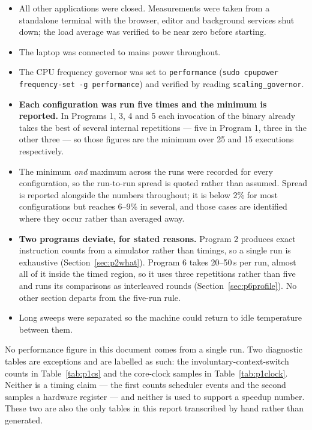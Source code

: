 \documentclass[11pt,a4paper]{article}
\begin{document}
\begin{itemize}
\item All other applications were closed. Measurements were taken from a
      standalone terminal with the browser, editor and background services
      shut down; the load average was verified to be near zero before
      starting.
\item The laptop was connected to mains power throughout.
\item The CPU frequency governor was set to \texttt{performance}
      (\texttt{sudo cpupower frequency-set -g performance}) and verified by
      reading \texttt{scaling\_governor}.
\item \textbf{Each configuration was run five times and the minimum is
      reported.} In Programs 1, 3, 4 and 5 each invocation of the binary
      already takes the best of several internal repetitions --- five in
      Program 1, three in the other three --- so those figures are the minimum
      over 25 and 15 executions respectively.
\item The minimum \emph{and} maximum across the runs were recorded for every
      configuration, so the run-to-run spread is quoted rather than assumed.
      Spread is reported alongside the numbers throughout; it is below 2\% for
      most configurations but reaches 6--9\% in several, and those cases are
      identified where they occur rather than averaged away.
\item \textbf{Two programs deviate, for stated reasons.} Program 2 produces
      exact instruction counts from a simulator rather than timings, so a
      single run is exhaustive (Section~\ref{sec:p2what}). Program 6 takes
      20--50\,s per run, almost all of it inside the timed region, so it uses
      three repetitions rather than five and runs its comparisons as
      interleaved rounds (Section~\ref{sec:p6profile}). No other section
      departs from the five-run rule.
\item Long sweeps were separated so the machine could return to idle
      temperature between them.
\end{itemize}

No performance figure in this document comes from a single run. Two
diagnostic tables are exceptions and are labelled as such: the
involuntary-context-switch counts in Table~\ref{tab:p1cs} and the core-clock
samples in Table~\ref{tab:p1clock}. Neither is a timing claim --- the first
counts scheduler events and the second samples a hardware register --- and
neither is used to support a speedup number. These two are also the only
tables in this report transcribed by hand rather than generated.
\end{document}
